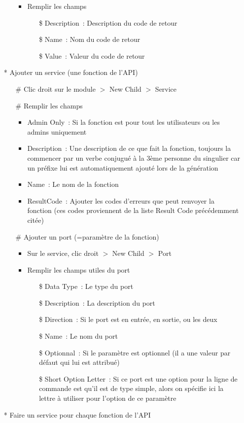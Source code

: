 \documentclass{article}
\begin{document}
\begin{itemize}
\begin{itemize}
\begin{itemize}
    \item Remplir les champs 
      \begin{itemize}
      \item[\$] Description~: Description du code de retour
      \item[\$] Name~: Nom du code de retour
      \item[\$] Value~: Valeur du code de retour
      \end{itemize}
    \end{itemize}
  \end{itemize}
\item[*] Ajouter un service (une fonction de l'API)
  \begin{itemize}
  \item[\#] Clic droit sur le module $>$ New Child $>$ Service
  \item[\#] Remplir les champs
    \begin{itemize}
    \item Admin Only~: Si la fonction est pour tout les utilisateurs ou les admins uniquement
    \item Description~: Une description de ce que fait la fonction, toujours la commencer par un verbe conjugu\'e \`a la 3\`eme personne du singulier car un pr\'efixe lui est automatiquement ajout\'e lors de la g\'en\'eration
    \item Name~: Le nom de la fonction
    \item ResultCode~: Ajouter les codes d'erreurs que peut renvoyer la fonction (ces codes proviennent de la liste Result Code pr\'ec\'edemment cit\'ee)
    \end{itemize}
  \item[\#] Ajouter un port (=param\`etre de la fonction)
    \begin{itemize}
    \item Sur le service, clic droit $>$ New Child $>$ Port
    \item Remplir les champs utiles du port
      \begin{itemize}
      \item[\$] Data Type~: Le type du port
      \item[\$] Description~: La description du port
      \item[\$] Direction~: Si le port est en entr\'ee, en sortie, ou les deux
      \item[\$] Name~: Le nom du port
      \item[\$] Optionnal~: Si le param\`etre est optionnel (il a une valeur par d\'efaut qui lui est attribu\'e)
      \item[\$] Short Option Letter~: Si ce port est une option pour la ligne de commande est qu'il est de type simple, alors on sp\'ecifie ici la lettre \`a utiliser pour l'option de ce param\`etre
      \end{itemize}
    \end{itemize}
  \end{itemize}
\item[*] Faire un service pour chaque fonction de l'API
\end{itemize}
\end{document}
